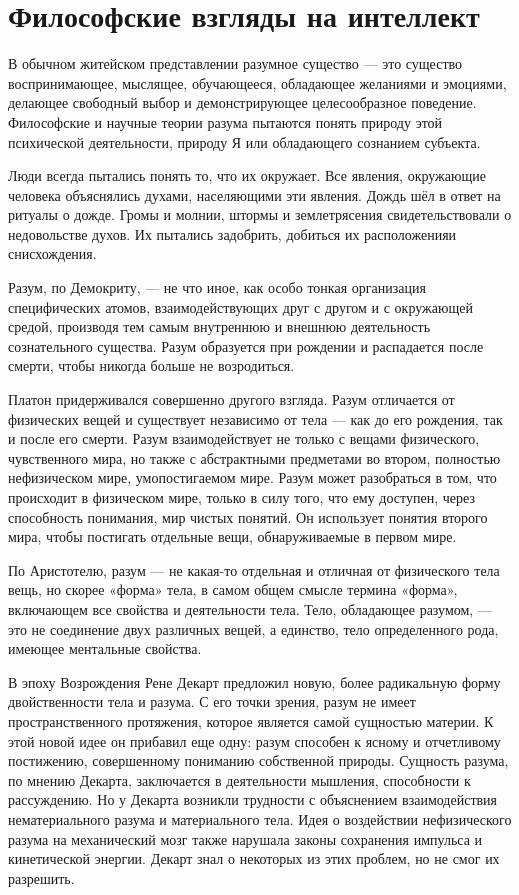 \section{Философские взгляды на интеллект}

В обычном житейском представлении разумное существо --- это существо воспринимающее, мыслящее, обучающееся, обладающее желаниями и эмоциями, делающее свободный выбор и демонстрирующее целесообразное поведение. Философские и научные теории разума пытаются понять природу этой психической деятельности, природу Я или обладающего сознанием субъекта.

Люди всегда пытались понять то, что их окружает. Все явления, окружающие человека объяснялись духами, населяющими эти явления. Дождь шёл в ответ на ритуалы о дожде. Громы и молнии, штормы и землетрясения свидетельствовали о недовольстве духов. Их пытались задобрить, добиться их расположенияи снисхождения.

Разум, по Демокриту, --- не что иное, как особо тонкая организация специфических атомов, взаимодействующих друг с другом и с окружающей средой, производя тем самым внутреннюю и внешнюю деятельность сознательного существа. Разум образуется при рождении и распадается после смерти, чтобы никогда больше не возродиться.

Платон придерживался совершенно другого взгляда. Разум отличается от физических вещей и существует независимо от тела --- как до его рождения, так и после его смерти. Разум взаимодействует не только с вещами физического, чувственного мира, но также с абстрактными предметами во втором, полностью нефизическом мире, умопостигаемом мире. Разум может разобраться в том, что происходит в физическом мире, только в силу того, что ему доступен, через способность понимания, мир чистых понятий. Он использует понятия второго мира, чтобы постигать отдельные вещи, обнаруживаемые в первом мире.

По Аристотелю, разум --- не какая-то отдельная и отличная от физического тела вещь, но скорее «форма» тела, в самом общем смысле термина «форма», включающем все свойства и деятельности тела. Тело, обладающее разумом, --- это не соединение двух различных вещей, а единство, тело определенного рода, имеющее ментальные свойства.

В эпоху Возрождения Рене Декарт предложил новую, более радикальную форму двойственности тела и разума. С его точки зрения, разум не имеет пространственного протяжения, которое является самой сущностью материи. К этой новой идее он прибавил еще одну: разум способен к ясному и отчетливому постижению, совершенному пониманию собственной природы. Сущность разума, по мнению Декарта, заключается в деятельности мышления, способности к рассуждению. Но у Декарта возникли трудности с объяснением взаимодействия нематериального разума и материального тела. Идея о воздействии нефизического разума на механический мозг также нарушала законы сохранения импульса и кинетической энергии. Декарт знал о некоторых из этих проблем, но не смог их разрешить.

